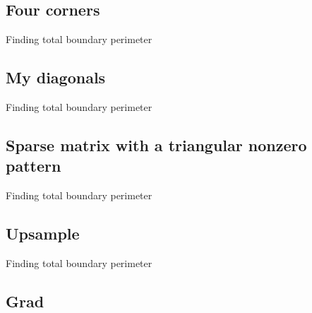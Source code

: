 \subsection{Four corners}

\begin{algorithm}
\caption{Finding total boundary perimeter}
\begin{algorithmic}[1]

\EndProcedure
\end{algorithmic}
\end{algorithm}

\subsection{My diagonals}

\begin{algorithm}
\caption{Finding total boundary perimeter}
\begin{algorithmic}[1]

\EndProcedure
\end{algorithmic}
\end{algorithm}

\subsection{Sparse matrix with a triangular nonzero pattern}

\begin{algorithm}
\caption{Finding total boundary perimeter}
\begin{algorithmic}[1]

\EndProcedure
\end{algorithmic}
\end{algorithm}

\subsection{Upsample}

\begin{algorithm}
\caption{Finding total boundary perimeter}
\begin{algorithmic}[1]

\EndProcedure
\end{algorithmic}
\end{algorithm}

\subsection{Grad}

